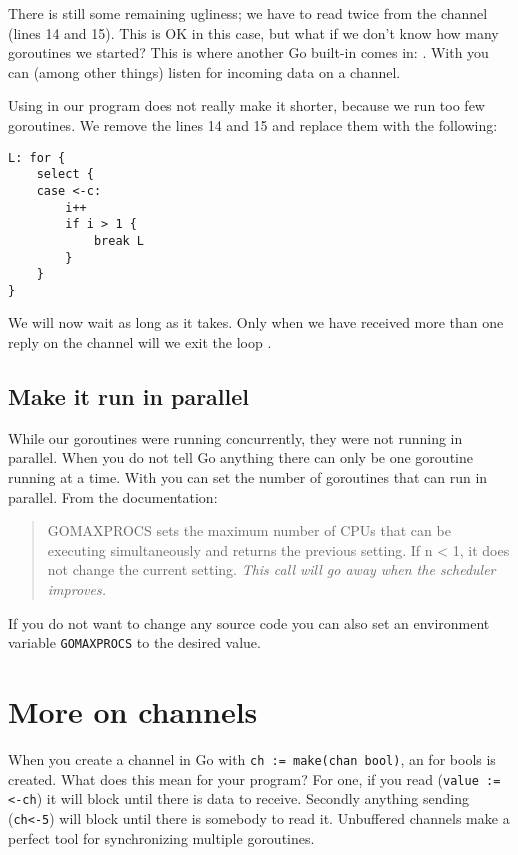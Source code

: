 \showremarks
There is still some remaining ugliness; we have to read twice from
the channel (lines 14 and 15). This is OK in this case, but what if
we don't know how many goroutines we started? This is where another
Go built-in comes in: . With  you 
can (among other things) listen for incoming data on a channel.

Using  in our program does not really make it shorter,
because we run too few go\-routines. We remove the lines 14 and 15 and
replace them with the following:
\begin{lstlisting}[caption=Using select,numbers=right,firstnumber=14]
L: for {
	select {
	case <-c:
		i++ 
		if i > 1 { 
			break L
		}   
	}   
}   
\end{lstlisting}
We will now wait as long as it takes. Only when we have received more than
one reply on the channel  will we exit the loop .

\subsection{Make it run in parallel}
While our goroutines were running concurrently, they were not running in
parallel. When you do not tell Go anything there can only be one
goroutine running at a time. With  you
can set the number of goroutines that can run in parallel. From
the documentation:
\begin{quote}
GOMAXPROCS sets the maximum number of CPUs that can be executing
simultaneously and returns the previous setting. If n < 1, it does not
change the current setting. \emph{This call will go away when the scheduler
improves.}
\end{quote}
If you do not want to change any source code you can also set an
environment variable \verb|GOMAXPROCS| to the desired value.

\section{More on channels}
\label{sec:more on channels}
When you create a channel in Go with \lstinline{ch := make(chan bool)}, 
an  for
bools is created. What does this mean for your program? For one, if you
read (\lstinline{value := <-ch}) it will block until there is data to
receive. Secondly anything sending (\lstinline{ch<-5}) will block until there
is somebody to read it. 
Unbuffered channels make a perfect tool for synchronizing multiple
goroutines.

